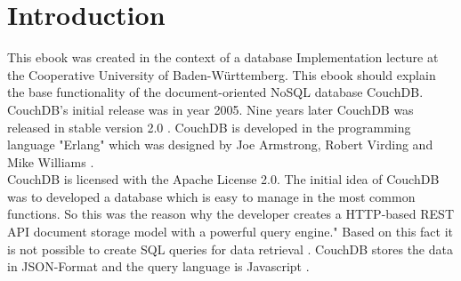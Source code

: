 \section{Introduction}
This ebook was created in the context of a database Implementation lecture at the Cooperative University of Baden-Württemberg. This ebook should explain the base functionality of the document-oriented NoSQL database CouchDB. CouchDB's initial release was in year 2005. Nine years later CouchDB was released in stable version 2.0 \cite{ApacheSoftwareFoundation.Branch}. CouchDB is developed in the programming language "Erlang" which was designed by	Joe Armstrong, Robert Virding and Mike Williams \cite{ErlangWikipedia.22.03.2017}.\\
CouchDB is licensed with the Apache License 2.0. The initial idea of CouchDB was to developed a database which is easy to manage in the most common functions. So this was the reason why the developer creates a HTTP-based REST API \cite{Anderson.2010.Buch} document storage model with a powerful query engine."\cite{Anderson.2010.Buch} Based on this fact it is not possible to create SQL queries for data retrieval \cite{Scheliga.2010}.
CouchDB stores the data in JSON-Format and the query language is Javascript \cite{MarcelWolfKeineKommentare.2016}.
\\
\\


